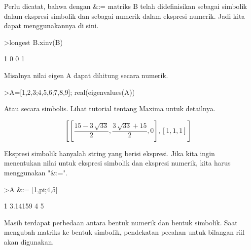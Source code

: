 \documentclass[a4paper,10pt]{article}
\begin{document}
\begin{eulernotebook}
\begin{eulercomment}
\begin{eulercomment}
\begin{eulercomment}
\begin{eulercomment}
\begin{eulercomment}
\begin{eulercomment}
\begin{eulercomment}
Perlu dicatat, bahwa dengan \&:= matriks B telah didefinisikan sebagai
simbolik dalam ekspresi simbolik dan sebagai numerik dalam ekspresi
numerik. Jadi kita dapat menggunakannya di sini.
\end{eulercomment}
\begin{eulerprompt}
>longest B.xinv(B)
\end{eulerprompt}
\begin{euleroutput}
                        1                       0 
                        0                       1 
\end{euleroutput}
\begin{eulercomment}
Misalnya nilai eigen A dapat dihitung secara numerik.
\end{eulercomment}
\begin{eulerprompt}
>A=[1,2,3;4,5,6;7,8,9]; real(eigenvalues(A))
\end{eulerprompt}
\begin{euleroutput}
  [16.1168,  -1.11684,  0]
\end{euleroutput}
\begin{eulercomment}
Atau secara simbolis. Lihat tutorial tentang Maxima untuk detailnya.
\end{eulercomment}
\begin{eulerformula}
\[
\left[ \left[ \frac{15-3\,\sqrt{33}}{2} , \frac{3\,\sqrt{33}+15}{2}   , 0 \right]  , \left[ 1 , 1 , 1 \right]  \right] 
\]
\end{eulerformula}
\begin{eulercomment}
Ekspresi simbolik hanyalah string yang berisi ekspresi. Jika kita
ingin menentukan nilai untuk ekspresi simbolik dan ekspresi numerik,
kita harus menggunakan "\&:=".
\end{eulercomment}
\begin{eulerprompt}
>A &:= [1,pi;4,5]
\end{eulerprompt}
\begin{euleroutput}
              1       3.14159 
              4             5 
\end{euleroutput}
\begin{eulercomment}
Masih terdapat perbedaan antara bentuk numerik dan bentuk simbolik.
Saat mengubah matriks ke bentuk simbolik, pendekatan pecahan untuk
bilangan riil akan digunakan.
\end{eulercomment}
\begin{eulerprompt}

\end{eulerprompt}
\end{eulercomment}
\end{eulercomment}
\end{eulercomment}
\end{eulercomment}
\end{eulercomment}
\end{eulercomment}
\end{eulernotebook}
\end{document}
